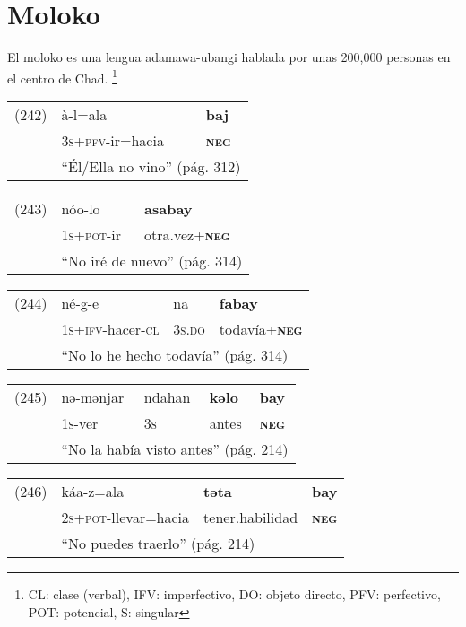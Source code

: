 \section*{Moloko}

\noindent El moloko es una lengua adamawa-ubangi hablada por unas 200,000 personas en el centro de Chad.
\footnote{CL: clase (verbal), IFV: imperfectivo, DO: objeto directo, PFV: perfectivo, POT: potencial, S: singular}
\vspace{0.5cm}

{\setmainfont{Charis SIL} 

\begin{tabular}{lll}
(242) & à-l=ala & \textbf{baj} \\
& \textsc{3s+pfv-}ir=hacia & \textsc{\textbf{neg}} \\
& \multicolumn{2}{l}{``Él/Ella no vino'' (pág. 312)}
\end{tabular} \vspace{0.5cm}

\begin{tabular}{lll}
(243) & nóo-lo & \textbf{asabay} \\
& \textsc{1s+pot-}ir & otra.vez+\textsc{\textbf{neg}} \\
& \multicolumn{2}{l}{``No iré de nuevo'' (pág. 314)}
\end{tabular} \vspace{0.5cm}

\begin{tabular}{llll}
(244) & né-g-e & na & \textbf{fabay} \\
& \textsc{1s+ifv-}hacer-\textsc{cl} & \textsc{3s.do} & todavía+\textsc{\textbf{neg}} \\
& \multicolumn{3}{l}{``No lo he hecho todavía'' (pág. 314)}
\end{tabular} \vspace{0.5cm}

\begin{tabular}{lllll}
(245) & nə-mənjar & ndahan & \textbf{kəlo} & \textbf{bay} \\
& \textsc{1s-}ver & \textsc{3s} & antes & \textsc{\textbf{neg}} \\
& \multicolumn{4}{l}{``No la había visto antes'' (pág. 214)}
\end{tabular} \vspace{0.5cm}

\begin{tabular}{llll}
(246) & káa-z=ala & \textbf{təta} & \textbf{bay} \\
& \textsc{2s+pot-}llevar=hacia & tener.habilidad & \textsc{\textbf{neg}} \\
& \multicolumn{3}{l}{``No puedes traerlo'' (pág. 214)}
\end{tabular} \vspace{0.5cm}

}

